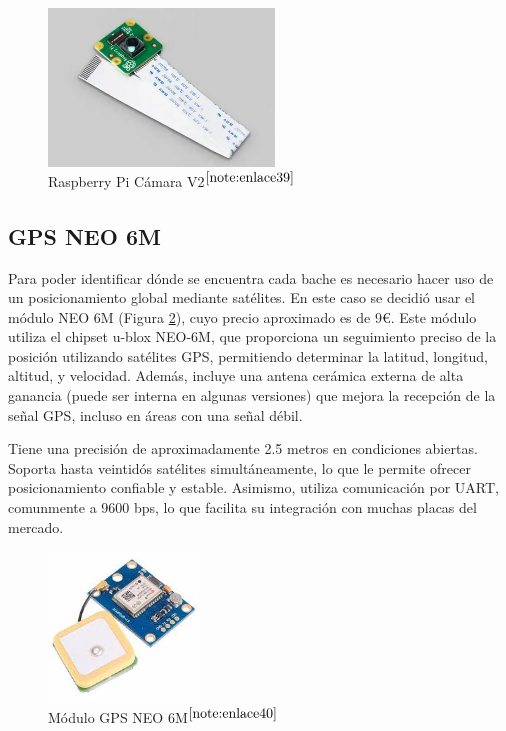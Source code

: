 \begin{figure} [h!]
	\begin{center}
		\includegraphics[width=6cm]{figs/campi.png}
	\end{center}
	\caption{Raspberry Pi Cámara V2$^{\ref{note:enlace39}}$} 
\label{fig:raspberrycam}
\end{figure}

\setcounter{footnote}{39} %

\subsection{GPS NEO 6M}

Para poder identificar dónde se encuentra cada bache es necesario hacer uso de un posicionamiento global mediante satélites. En este caso se decidió usar el módulo NEO 6M (Figura \ref{fig:gps}), cuyo precio aproximado es de 9€. Este módulo utiliza el chipset u-blox NEO-6M, que proporciona un seguimiento preciso de la posición utilizando satélites \acs{GPS}, permitiendo determinar la latitud, longitud, altitud, y velocidad. Además, incluye una antena cerámica externa de alta ganancia (puede ser interna en algunas versiones) que mejora la recepción de la señal \acs{GPS}, incluso en áreas con una señal débil.

Tiene una precisión de aproximadamente 2.5 metros en condiciones abiertas. Soporta hasta veintidós satélites simultáneamente, lo que le permite ofrecer posicionamiento confiable y estable. Asimismo, utiliza comunicación por \ac{UART}, comunmente a 9600 bps, lo que facilita su integración con muchas placas del mercado.

\begin{figure} [h!]
	\begin{center}
		\includegraphics[width=4cm]{figs/GPSNEO6MV2.jpeg}
	\end{center}
	\caption{Módulo GPS NEO 6M$^{\ref{note:enlace40}}$} 
\label{fig:gps}
\end{figure}

